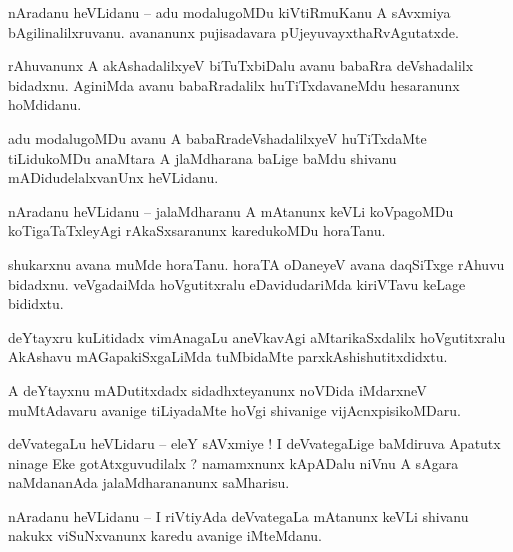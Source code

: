 \documentclass{article}
\begin{document}
\begin{mn}%
nAradanu heVLidanu -- adu modalugoMDu kiVtiRmuKanu A sAvxmiya bAgilinalilxruvanu. avananunx 
pujisadavara pUjeyuvayxthaRvAgutatxde.
\end{mn}

\begin{mn}%
rAhuvanunx A akAshadalilxyeV biTuTxbiDalu avanu babaRra deVshadalilx bidadxnu. AginiMda avanu 
babaRradalilx huTiTxdavaneMdu hesaranunx hoMdidanu.
\end{mn}

\begin{mn}%
adu modalugoMDu avanu A babaRradeVshadalilxyeV huTiTxdaMte tiLidukoMDu anaMtara A jlaMdharana 
baLige baMdu shivanu mADidudelalxvanUnx heVLidanu.
\end{mn}


\begin{mn}%
nAradanu heVLidanu -- jalaMdharanu A mAtanunx keVLi koVpagoMDu koTigaTaTxleyAgi rAkaSxsaranunx 
karedukoMDu horaTanu.
\end{mn}

\begin{mn}%
shukarxnu avana muMde horaTanu. horaTA oDaneyeV avana daqSiTxge rAhuvu bidadxnu. veVgadaiMda 
hoVgutitxralu eDavidudariMda kiriVTavu keLage bididxtu.
\end{mn}

\begin{mn}%
deYtayxru kuLitidadx vimAnagaLu aneVkavAgi aMtarikaSxdalilx hoVgutitxralu AkAshavu 
mAGapakiSxgaLiMda tuMbidaMte parxkAshishutitxdidxtu.
\end{mn}

\begin{mn}%
A deYtayxnu mADutitxdadx sidadhxteyanunx noVDida iMdarxneV muMtAdavaru avanige tiLiyadaMte hoVgi 
shivanige vijAcnxpisikoMDaru.
\end{mn}

\begin{mn}%
deVvategaLu heVLidaru -- eleY sAVxmiye ! I deVvategaLige baMdiruva Apatutx ninage Eke 
gotAtxguvudilalx ? namamxnunx kApADalu niVnu A sAgara naMdananAda jalaMdharananunx saMharisu.
\end{mn}

\begin{mn}%
nAradanu heVLidanu -- I riVtiyAda deVvategaLa mAtanunx keVLi shivanu nakukx viSuNxvanunx karedu 
avanige iMteMdanu.
\end{mn}
\end{document}
